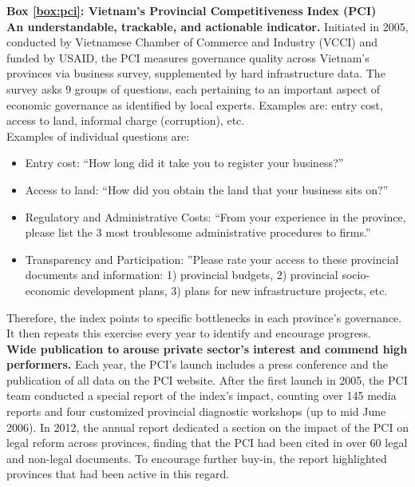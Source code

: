 \documentclass[12pt]{article}
\begin{document}
\begin{textbox}
    \textbf{Box \ref{box:pci}: Vietnam's Provincial Competitiveness Index (PCI)}\\

    \textbf{An understandable, trackable, and actionable indicator.} Initiated in 2005, conducted by Vietnamese Chamber of Commerce and Industry (VCCI) and funded by USAID, the PCI measures governance quality across Vietnam's provinces via business survey, supplemented by hard infrastructure data. The survey asks 9 groups of questions, each pertaining to an important aspect of economic governance as identified by local experts. Examples are: entry cost, access to land, informal charge (corruption), etc.\\

    Examples of individual questions are:
    \begin{itemize}[noitemsep]
       \item{Entry cost: ``How long did it take you to register your business?''}
       \item{Access to land: ``How did you obtain the land that your business sits on?''}
       \item{Regulatory and Administrative Costs: ``From your experience in the province, please list the 3 most troublesome administrative procedures to firms.''}
       \item{Transparency and Participation: ''Please rate your access to these provincial documents and information: 1) provincial budgets, 2) provincial socio-economic development plans, 3) plans for new infrastructure projects, etc.}
    \end{itemize}
    Therefore, the index points to specific bottlenecks in each province's governance. It then repeats this exercise every year to identify and encourage progress.\\

    \textbf{Wide publication to arouse private sector's interest and commend high performers.} Each year, the PCI's launch includes a press conference and the publication of all data on the PCI website. After the first launch in 2005, the PCI team conducted a special report of the index's impact, counting over 145 media reports and four customized provincial diagnostic workshops (up to mid June 2006). In 2012, the annual report dedicated a section on the impact of the PCI on legal reform across provinces, finding that the PCI had been cited in over 60 legal and non-legal documents. To encourage further buy-in, the report highlighted provinces that had been active in this regard.\\


\end{textbox}
\end{document}
